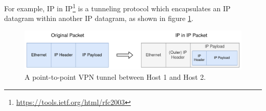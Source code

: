 \documentclass[a4paper,12pt]{report}
\begin{document}
		For example, IP in IP\footnote{\url{https://tools.ietf.org/html/rfc2003}} is a tunneling protocol which encapsulates an IP datagram within another IP datagram, as shown in figure \ref{fig:ip-in-ip_packet}.
		\begin{figure}[h]
			\includegraphics[width=\textwidth]{ip-in-ip_packet}
			\centering
			\caption{A point-to-point VPN tunnel between Host 1 and Host 2.}
			\label{fig:ip-in-ip_packet}
		\end{figure}



\end{document}
